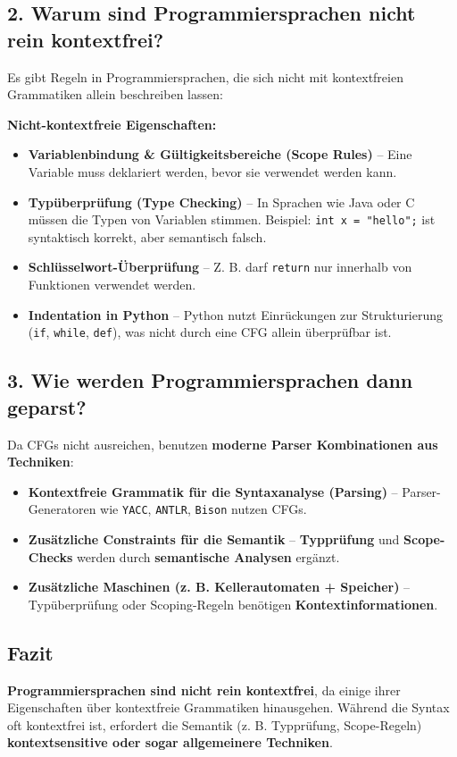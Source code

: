 \documentclass[a4paper,12pt]{article}
\begin{document}
\begin{enumerate}
		\subsection*{2. Warum sind Programmiersprachen nicht rein kontextfrei?}
		Es gibt Regeln in Programmiersprachen, die sich nicht mit kontextfreien Grammatiken allein beschreiben lassen:
		
		\textbf{Nicht-kontextfreie Eigenschaften:}
		\begin{itemize}
			\item \textbf{Variablenbindung \& Gültigkeitsbereiche (Scope Rules)} – Eine Variable muss deklariert werden, bevor sie verwendet werden kann.
			\item \textbf{Typüberprüfung (Type Checking)} – In Sprachen wie Java oder C müssen die Typen von Variablen stimmen. Beispiel: \texttt{int x = "hello";} ist syntaktisch korrekt, aber semantisch falsch.
			\item \textbf{Schlüsselwort-Überprüfung} – Z. B. darf \texttt{return} nur innerhalb von Funktionen verwendet werden.
			\item \textbf{Indentation in Python} – Python nutzt Einrückungen zur Strukturierung (\texttt{if}, \texttt{while}, \texttt{def}), was nicht durch eine CFG allein überprüfbar ist.
		\end{itemize}
		
		\subsection*{3. Wie werden Programmiersprachen dann geparst?}
		Da CFGs nicht ausreichen, benutzen \textbf{moderne Parser Kombinationen aus Techniken}:
		\begin{itemize}
			\item \textbf{Kontextfreie Grammatik für die Syntaxanalyse (Parsing)} – Parser-Generatoren wie \texttt{YACC}, \texttt{ANTLR}, \texttt{Bison} nutzen CFGs.
			\item \textbf{Zusätzliche Constraints für die Semantik} – \textbf{Typprüfung} und \textbf{Scope-Checks} werden durch \textbf{semantische Analysen} ergänzt.
			\item \textbf{Zusätzliche Maschinen (z. B. Kellerautomaten + Speicher)} – Typüberprüfung oder Scoping-Regeln benötigen \textbf{Kontextinformationen}.
		\end{itemize}
		
		\subsection*{Fazit}
		\textbf{Programmiersprachen sind nicht rein kontextfrei}, da einige ihrer Eigenschaften über kontextfreie Grammatiken hinausgehen. Während die Syntax oft kontextfrei ist, erfordert die Semantik (z. B. Typprüfung, Scope-Regeln) \textbf{kontextsensitive oder sogar allgemeinere Techniken}.
		

\end{enumerate}
\end{document}

